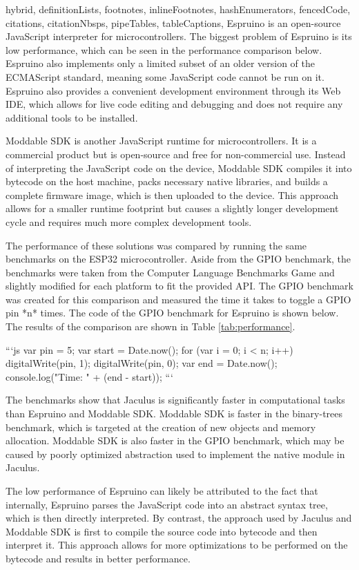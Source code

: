 \begin{markdown*}{%
  hybrid,
  definitionLists,
  footnotes,
  inlineFootnotes,
  hashEnumerators,
  fencedCode,
  citations,
  citationNbsps,
  pipeTables,
  tableCaptions,
}
Espruino is an open-source JavaScript interpreter for microcontrollers. The biggest problem of Espruino is its low performance, which can be seen in the performance comparison below. Espruino also implements only a limited subset of an older version of the ECMAScript standard, meaning some JavaScript code cannot be run on it. Espruino also provides a convenient development environment through its Web IDE, which allows for live code editing and debugging and does not require any additional tools to be installed.

Moddable SDK is another JavaScript runtime for microcontrollers. It is a commercial product but is open-source and free for non-commercial use. Instead of interpreting the JavaScript code on the device, Moddable SDK compiles it into bytecode on the host machine, packs necessary native libraries, and builds a complete firmware image, which is then uploaded to the device. This approach allows for a smaller runtime footprint but causes a slightly longer development cycle and requires much more complex development tools.

The performance of these solutions was compared by running the same benchmarks on the ESP32 microcontroller. Aside from the GPIO benchmark, the benchmarks were taken from the Computer Language Benchmarks Game\cite{bench-game} and slightly modified for each platform to fit the provided API. The GPIO benchmark was created for this comparison and measured the time it takes to toggle a GPIO pin *n* times. The code of the GPIO benchmark for Espruino is shown below. The results of the comparison are shown in Table \ref{tab:performance}.

```js
var pin = 5;
var start = Date.now();
for (var i = 0; i < n; i++) {
  digitalWrite(pin, 1);
  digitalWrite(pin, 0);
}
var end = Date.now();
console.log("Time: " + (end - start));
```

The benchmarks show that Jaculus is significantly faster in computational tasks than Espruino and Moddable SDK. Moddable SDK is faster in the binary-trees benchmark, which is targeted at the creation of new objects and memory allocation. Moddable SDK is also faster in the GPIO benchmark, which may be caused by poorly optimized abstraction used to implement the native module in Jaculus.

The low performance of Espruino can likely be attributed to the fact that internally, Espruino parses the JavaScript code into an abstract syntax tree, which is then directly interpreted. By contrast, the approach used by Jaculus and Moddable SDK is first to compile the source code into bytecode and then interpret it. This approach allows for more optimizations to be performed on the bytecode and results in better performance.



\end{markdown*}
